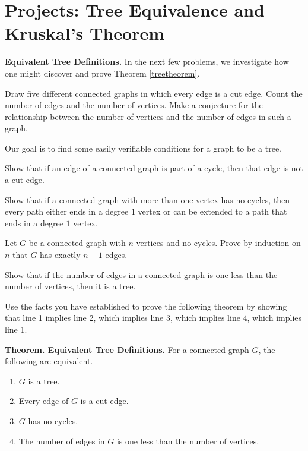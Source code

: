 \section{Projects: Tree Equivalence and Kruskal's Theorem} \label{KruskalProject}

\noindent \textbf{Equivalent Tree Definitions.}  In the next few problems, we investigate how one might discover and prove Theorem \ref{treetheorem}.

\begin{prb}\label{5 trees}
Draw five different connected graphs in which every edge is a cut edge.  Count the number of edges and the number of vertices. Make a conjecture for the relationship between the number of vertices and the number of edges in such a graph.
\end{prb}

\noindent Our goal is to find some easily verifiable conditions for a graph to be a tree.

\begin{prb}
Show that if an edge of a connected graph is part of a cycle, then that edge is not a cut edge.
\end{prb}

\begin{prb}
Show that if a connected graph with more than one vertex has no cycles, then every path either ends in a degree $1$ vertex or can be extended to a path that ends in a degree $1$ vertex.
\end{prb}

\begin{prb}
Let $G$ be a connected graph with $n$ vertices and no cycles.  Prove by induction on $n$ that $G$ has exactly $n-1$ edges.
\end{prb}

\begin{prb}
Show that if the number of edges in a connected graph is one less than the number of vertices, then it is a tree.
\end{prb}

\begin{prb}
Use the facts you have established to prove the following theorem by showing that line 1 implies line 2, which implies line 3, which implies line 4, which implies line 1.
\end{prb}

\noindent \textbf{Theorem. Equivalent Tree Definitions.}  For a connected graph $G$, the following are equivalent.
  \begin{enumerate}
     \item $G$ is a tree.
     \item Every edge of $G$ is a cut edge.
     \item $G$ has no cycles.
     \item The number of edges in $G$ is one less than the number of vertices.
  \end{enumerate}

